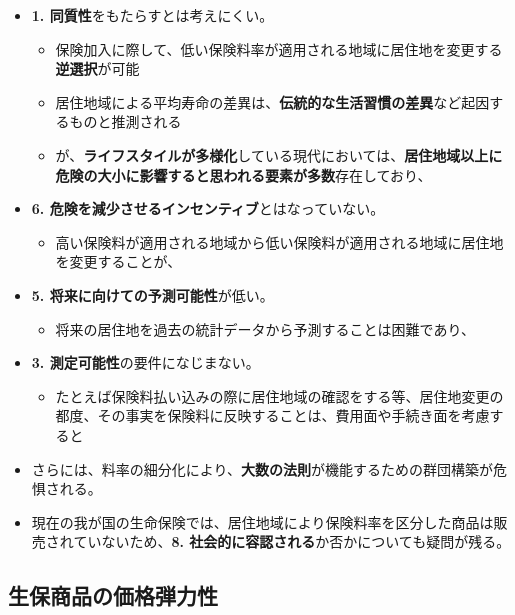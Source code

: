 \documentclass[report,gutter=10mm,fore-edge=10mm,uplatex,dvipdfmx]{jlreq}
\begin{document}
\begin{itemize}
\tightlist
\item
  \textbf{1. 同質性}をもたらすとは考えにくい。

  \begin{itemize}
  \tightlist
  \item
    保険加入に際して、低い保険料率が適用される地域に居住地を変更する\textbf{逆選択}が可能
  \item
    居住地域による平均寿命の差異は、\textbf{伝統的な生活習慣の差異}など起因するものと推測される
  \item
    が、\textbf{ライフスタイルが多様化}している現代においては、\textbf{居住地域以上に危険の大小に影響すると思われる要素が多数}存在しており、
  \end{itemize}
\item
  \textbf{6. 危険を減少させるインセンティブ}とはなっていない。

  \begin{itemize}
  \tightlist
  \item
    高い保険料が適用される地域から低い保険料が適用される地域に居住地を変更することが、
  \end{itemize}
\item
  \textbf{5. 将来に向けての予測可能性}が低い。

  \begin{itemize}
  \tightlist
  \item
    将来の居住地を過去の統計データから予測することは困難であり、
  \end{itemize}
\item
  \textbf{3. 測定可能性}の要件になじまない。

  \begin{itemize}
  \tightlist
  \item
    たとえば保険料払い込みの際に居住地域の確認をする等、居住地変更の都度、その事実を保険料に反映することは、費用面や手続き面を考慮すると
  \end{itemize}
\item
  さらには、料率の細分化により、\textbf{大数の法則}が機能するための群団構築が危惧される。
\item
  現在の我が国の生命保険では、居住地域により保険料率を区分した商品は販売されていないため、\textbf{8.
  社会的に容認される}か否かについても疑問が残る。
\end{itemize}


\subsection{生保商品の価格弾力性}
\end{document}
